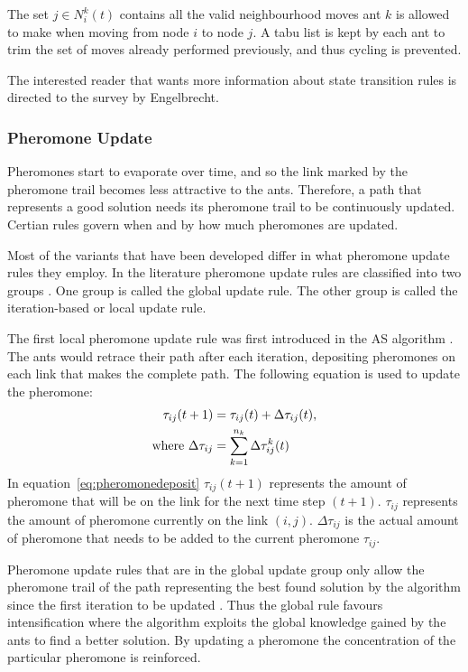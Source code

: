 The set $j \in N^k_i(t)$ contains all the valid neighbourhood moves ant $k$ is allowed to make when moving from node $i$ to node $j$. A tabu list is kept by each ant to trim the set of moves already performed previously, and thus cycling is prevented.

The interested reader that wants more information about state transition rules is directed to the survey by Engelbrecht\cite{FundamentalSwarm}.
\subsubsection{Pheromone Update}
Pheromones start to evaporate over time, and so the link marked by the pheromone trail becomes less attractive to the ants. Therefore, a path that represents a good solution needs its pheromone trail to be continuously updated. Certian rules govern when and by how much pheromones are updated.

 Most of the variants that have been developed differ in what pheromone update rules they employ. In the literature pheromone update rules are classified into two groups \cite{CompuIntelligenceIntro}. One group is called the global update rule. The other group is called the iteration-based or local update rule\cite{CompuIntelligenceIntro}. 

The first local pheromone update rule was first introduced in the AS algorithm \cite{CompuIntelligenceIntro,AntSurvey,AntsAndStigmergy}. The ants would retrace their path after each iteration, depositing pheromones on each link that makes the complete path. The following equation is used to update the pheromone:
\begin{align}
\label{eq:pheromonedeposit}
 \tau_{ij}(t+1) &= \tau_{ij}(t) + \Delta\tau_{ij}(t),\\ 
 \text{where }\Delta\tau_{ij} &= \sum^{n_k}_{k=1}\Delta\tau^k_{ij}(t) \notag
\end{align}
In equation~\ref{eq:pheromonedeposit} $\tau_{ij}(t+1)$ represents the amount of pheromone that will be on the link for the next time step $(t+1)$. $\tau_{ij}$ represents the amount of pheromone currently on the link $(i,j)$. $\Delta\tau_{ij}$ is the actual amount of pheromone that needs to be added to the current pheromone $\tau_{ij}$.

Pheromone update rules that are in the global update group only allow the pheromone trail of the path representing the best found solution by the algorithm since the first iteration to be updated \cite{CompuIntelligenceIntro}. Thus the global rule favours intensification where the algorithm exploits the global knowledge gained by the ants to find a better solution. By updating a pheromone the concentration of the particular pheromone is reinforced.

